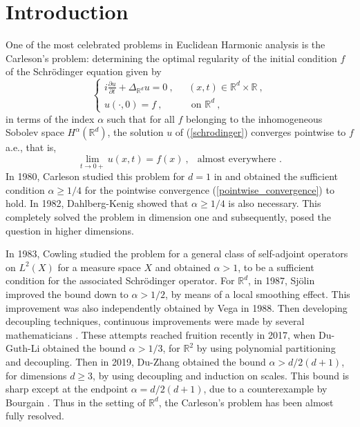 \documentclass[12pt]{amsart}
\theoremstyle{definition}
\newcommand{\R}{\mathbb R}%
\numberwithin{equation}{section}
\begin{document}
\section{Introduction}
One of the most celebrated problems in Euclidean Harmonic analysis is the Carleson's problem: determining the optimal regularity of the initial condition $f$ of the
Schr\"odinger equation given by
\begin{equation} \label{schrodinger}
\begin{cases}
	 i\frac{\partial u}{\partial t} +\Delta_{\R^d} u=0\:,\:\:\:  &(x,t) \in \R^d \times \R\:, \\
	u(\cdot, 0)=f\:, &\text{ on } \R^d \:,
	\end{cases}
\end{equation}
in terms of the index $\alpha$ such that for all $f$ belonging to the inhomogeneous Sobolev space $H^\alpha(\R^d)$, the solution $u$ of (\ref{schrodinger}) converges pointwise to $f$ a.e., that is, 
\begin{equation} \label{pointwise_convergence}
\displaystyle\lim_{t \to 0+} u(x,t)=f(x)\:,\:\:\text{ almost everywhere }.
\end{equation}
In 1980, Carleson studied this problem for $d=1$ in \cite{C} and obtained the sufficient condition $\alpha \ge 1/4$ for the pointwise convergence (\ref{pointwise_convergence}) to hold. In 1982, Dahlberg-Kenig \cite{DK} showed that $\alpha \ge 1/4$ is also necessary. This completely solved the problem in dimension one and subsequently, posed the question in higher dimensions.

\medskip

In 1983, Cowling \cite{Cowling} studied the problem for a general class of self-adjoint operators on $L^2(X)$ for a measure space $X$  and obtained $\alpha > 1$, to be a sufficient condition for the associated Schr\"odinger operator. For $\R^d$, in 1987, Sj\"olin \cite{Sjolin} improved the bound down to $\alpha > 1/2$, by means of a local smoothing effect. This improvement was also independently obtained by Vega \cite{Vega} in 1988. Then developing decoupling techniques, continuous improvements were made by several mathematicians \cite{Bourgain1, MVV, Tao, Lee}. These attempts reached fruition recently in 2017, when Du-Guth-Li \cite{DGL} obtained the bound $\alpha > 1/3$, for $\R^2$ by using polynomial partitioning and decoupling. Then in 2019, Du-Zhang \cite{DZ} obtained the bound $\alpha > d/2(d+1)$, for dimensions $d \ge 3$, by using decoupling and induction on scales. This bound is sharp except at the endpoint $\alpha =d/2(d+1)$, due to a counterexample by Bourgain \cite{Bourgain}. Thus in the setting of $\R^d$, the Carleson's problem has been almost fully resolved.
\end{document}
